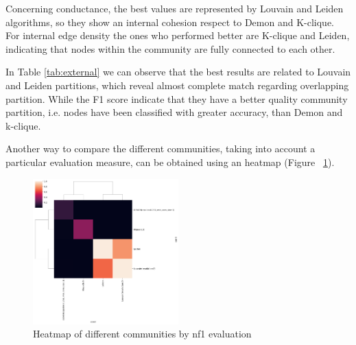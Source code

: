 \documentclass[sigchi]{acmart}
\begin{document}
\begin{table}[htbp]
\centering
\caption{Internal evaluation results}
\end{table}


Concerning conductance, the best values are represented by Louvain and Leiden algorithms, so they show an internal cohesion respect to Demon and K-clique. For internal edge density the ones who performed better are K-clique and Leiden, indicating that nodes within the community are fully connected to each other. 

\begin{table}[htbp]
\centering
\caption{External evaluation results}
\label{tab:external}
\end{table}

In Table \ref{tab:external} we can observe that the best results are related to Louvain and Leiden partitions, which reveal almost complete match regarding overlapping partition. While the F1 score indicate that they have a better quality community partition, i.e. nodes have been classified with greater accuracy, than Demon and k-clique.

Another way to compare the different communities, taking into account a particular evaluation measure, can be obtained using an heatmap (Figure ~\ref{fig:immagine_heat_com}).  

\begin{figure}[H]
  \centering
  \includegraphics[width=0.5\textwidth]{nf1.png}
  \caption{Heatmap of different communities by nf1 evaluation}
  \label{fig:immagine_heat_com}
\end{figure}
\FloatBarrier
\end{document}
